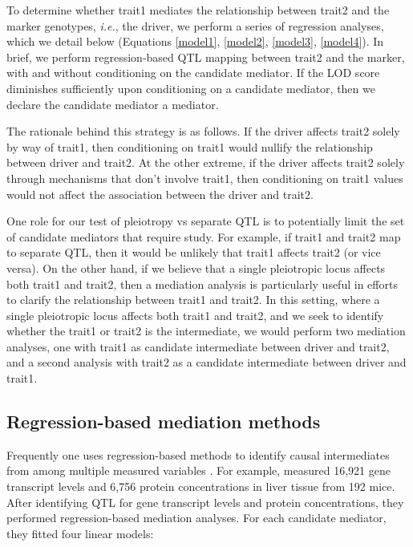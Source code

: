 \documentclass{article}
\begin{document}
To determine whether trait1 mediates the relationship between trait2 and the marker genotypes, \emph{i.e.}, the driver, we perform a series of regression analyses, which we detail below (Equations \ref{model1}, \ref{model2}, \ref{model3}, \ref{model4}). In brief, we perform regression-based QTL mapping between trait2 and the marker, with and without conditioning on the candidate mediator. If the LOD score diminishes sufficiently upon conditioning on a candidate mediator, then we declare the candidate mediator a mediator. 

The rationale behind this strategy is as follows. If the driver affects trait2 solely by way of trait1, then conditioning on trait1 would nullify the relationship between driver and trait2. At the other extreme, if the driver affects trait2 solely through mechanisms that don't involve trait1, then conditioning on trait1 values would not affect the association between the driver and trait2.

One role for our test of pleiotropy vs separate QTL is to potentially limit the set of candidate mediators that require study. For example, if trait1 and trait2 map to separate QTL, then it would be unlikely that trait1 affects trait2 (or vice versa). On the other hand, if we believe that a single pleiotropic locus affects both trait1 and trait2, then a mediation analysis is particularly useful in efforts to clarify the relationship between trait1 and trait2. In this setting, where a single pleiotropic locus affects both trait1 and trait2, and we seek to identify whether the trait1 or trait2 is the intermediate, we would perform two mediation analyses, one with trait1 as candidate intermediate between driver and trait2, and a second analysis with trait2 as a candidate intermediate between driver and trait1. 

\subsection{Regression-based mediation methods}

Frequently one uses regression-based methods to identify causal intermediates from among multiple measured variables \citep{baron1986moderator}. For example, \citet{chick2016defining} measured 16,921 gene transcript levels and 6,756 protein concentrations in liver tissue from 192 mice. After identifying QTL for gene transcript levels and protein concentrations, they performed regression-based mediation analyses. For each candidate mediator, they fitted four linear models: 
\end{document}

